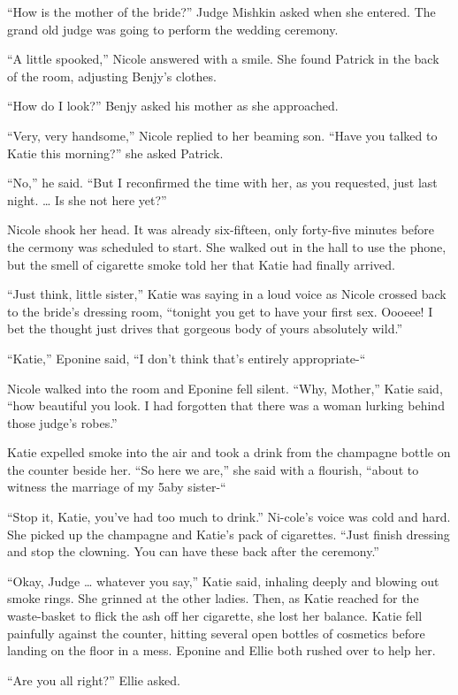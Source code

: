 \documentclass[]{article}
\begin{document}
{“How is the mother of the bride?” Judge Mishkin asked when she entered. The grand old judge was going to perform the wedding ceremony.

“A little spooked,” Nicole answered with a smile. She found Patrick in the back of the room, adjusting Benjy’s clothes.

“How do I look?” Benjy asked his mother as she approached.

“Very, very handsome,” Nicole replied to her beaming son. “Have you talked to Katie this morning?” she asked Patrick.

“No,” he said. “But I reconfirmed the time with her, as you requested, just last night. … Is she not here yet?”

Nicole shook her head. It was already six-fifteen, only forty-five minutes before the cermony was scheduled to start. She walked out in the hall to use the phone, but the smell of cigarette smoke told her that Katie had finally arrived.

“Just think, little sister,” Katie was saying in a loud voice as Nicole crossed back to the bride’s dressing room, “tonight you get to have your first sex. Oooeee! I bet the thought just drives that gorgeous body of yours absolutely wild.”

“Katie,” Eponine said, “I don’t think that’s entirely appropriate-“

Nicole walked into the room and Eponine fell silent. “Why, Mother,” Katie said, “how beautiful you look. I had forgotten that there was a woman lurking behind those judge’s robes.”

Katie expelled smoke into the air and took a drink from the champagne bottle on the counter beside her. “So here we are,” she said with a flourish, “about to witness the marriage of my 5aby sister-“

“Stop it, Katie, you’ve had too much to drink.” Ni-cole’s voice was cold and hard. She picked up the champagne and Katie’s pack of cigarettes. “Just finish dressing and stop the clowning. You can have these back after the ceremony.”

“Okay, Judge … whatever you say,” Katie said, inhaling deeply and blowing out smoke rings. She grinned at the other ladies. Then, as Katie reached for the waste-basket to flick the ash off her cigarette, she lost her balance. Katie fell painfully against the counter, hitting several open bottles of cosmetics before landing on the floor in a mess. Eponine and Ellie both rushed over to help her.

“Are you all right?” Ellie asked.

}
\end{document}
